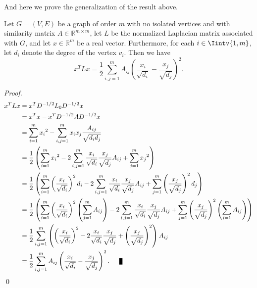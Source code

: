 And here we prove the generalization of the result above.

\begin{proposition}\label{xtlx2}
   Let $G = (V,E)$ be a graph of order $m$ with no isolated vertices and with similarity matrix $A \in \mathbb R^{m \times m}$, let $L$ be the normalized Laplacian matrix associated with $G$, and let $x \in \mathbb R^{m} $ be a real vector. Furthermore, for each $i \in \Iintv{1,m}$, let $d_i$ denote the degree of the vertex $v_i$. Then we have
   \begin{equation}
      x^TLx = \frac{1}{2}\sum_{i,j = 1}^m A_{ij} \left( \frac{x_i}{\sqrt{d_i}} - \frac{x_j}{\sqrt{d_j}} \right)^2.
   \end{equation}
\end{proposition}

\begin{proof}
   \begin{equation*} 
      \begin{split}
         x^TLx &= x^T D ^{-1/2} L_0 D^{-1/2} x \\
         &= x^Tx - x^TD^{-1/2}AD^{-1/2}x \\
         &= \sum_{i=1}^m {x_i}^2 - \sum_{i,j = 1}^m x_i  x_j \frac{A_{ij}}{\sqrt{d_i d_j}}  \\
         &= \frac{1}{2} \left( \sum_{i=1}^m {x_i}^2 - 2\sum_{i,j = 1}^m \frac{x_i}{\sqrt{d_i}} \frac{x_j}{\sqrt{d_j}} A_{ij} + \sum_{j=1}^m {x_j}^2 \right) \\
         &= \frac{1}{2} \left( \sum_{i=1}^m \left( \frac{x_i}{\sqrt{d_i}} \right) ^2 d_i - 2\sum_{i,j = 1}^m \frac{x_i}{\sqrt{d_i}} \frac{x_j}{\sqrt{d_j}} A_{ij} +  \sum_{j=1}^m \left( \frac{x_j}{\sqrt{d_j}} \right) ^2 d_j \right) \\
         &= \frac{1}{2} \left( \sum_{i=1}^m \left( \frac{x_i}{\sqrt{d_i}} \right) ^2 \left( \sum_{j=1}^m A_{ij} \right) - 2\sum_{i,j = 1}^m \frac{x_i}{\sqrt{d_i}} \frac{x_j}{\sqrt{d_j}} A_{ij} +  \sum_{j=1}^m \left( \frac{x_j}{\sqrt{d_j}} \right) ^2 \left( \sum_{i=1}^m A_{ij} \right) \right) \\
         &= \frac{1}{2} \sum_{i,j=1}^m \left( \left( \frac{x_i}{\sqrt{d_i}} \right)^2 - 2\frac{x_i}{\sqrt{d_i}}\frac{x_j}{\sqrt{d_j}} + \left( \frac{x_j}{\sqrt{d_j}} \right) ^2 \right) A_{ij} \\
         &= \frac{1}{2} \sum_{i,j=1}^m A_{ij} \left( \frac{x_i}{\sqrt{d_i}}- \frac{x_j}{\sqrt{d_j}} \right)^2. \qed
      \end{split}
   \end{equation*}\qed
\end{proof}

